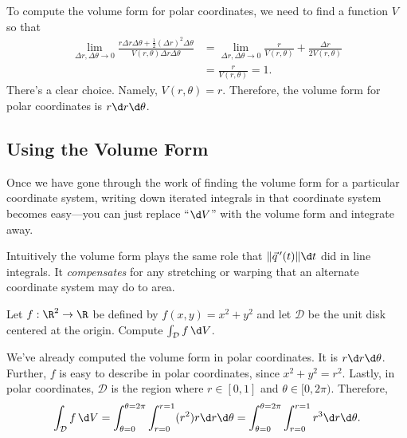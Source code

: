 \begin{example}
\begin{center}
	\end{center}

	To compute the volume form for polar coordinates, we need to find a function $V$ so that
	\begin{align*}
		\lim_{\Delta r,\Delta \theta\to 0}
		\frac{r\Delta r\Delta \theta+\tfrac{1}{2}(\Delta r)^2\Delta \theta}{V(r,\theta)\Delta r\Delta\theta}
		&=\lim_{\Delta r,\Delta \theta\to 0}
		\frac{r}{V(r,\theta)} + \frac{\Delta r}{2V(r,\theta)}\\
		&=\frac{r}{V(r,\theta)} = 1.
	\end{align*}
	There's a clear choice.  Namely, $V(r,\theta)=r$.  Therefore, the volume form for
	polar coordinates is $r\d r\d \theta$.

\end{example}

\subsection{Using the Volume Form}

Once we have gone through the work of finding the volume form for a particular
coordinate system, writing down iterated integrals in that coordinate
system becomes easy---you can just replace ``$\d V$'' with the volume form
and integrate away.

Intuitively the volume form plays the same role that $\norm{\vec q\,'(t)}\d t$ did
in line integrals.  It \emph{compensates} for any stretching or warping that
an alternate coordinate system may do to area.

\begin{example}
	Let $f:\R^2\to\R$ be defined by $f(x,y)=x^2+y^2$ and let $\mathcal D$ be the unit
	disk centered at the origin.  Compute $\int_{\mathcal D} f\,\d V$.

	We've already computed the volume form in polar coordinates.  It is
	$r\d r\d\theta$.  Further, $f$ is easy to describe in polar coordinates,
	since $x^2+y^2=r^2$.  Lastly, in polar coordinates, $\mathcal D$ 
	is the region where $r\in[0,1]$ and $\theta\in[0,2\pi)$.  Therefore,
	\[
		\int_{\mathcal D}f\,\d V =
		\int_{\theta=0}^{\theta=2\pi}\int_{r=0}^{r=1} (r^2)r\d r\d \theta
		=\int_{\theta=0}^{\theta=2\pi}\int_{r=0}^{r=1} r^3\d r\d \theta.
	\]
\end{example}

